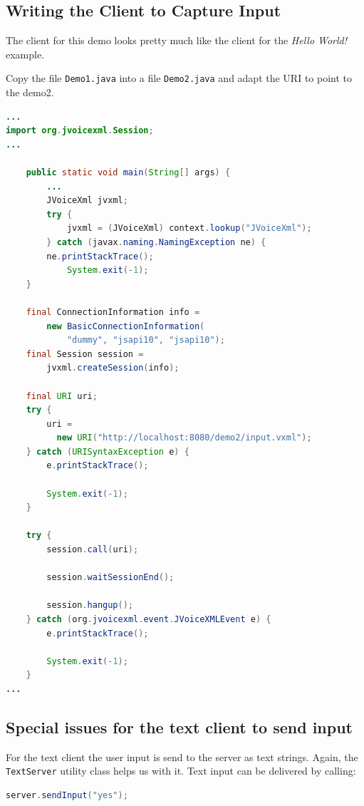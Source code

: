 \documentclass[11pt,a4paper]{book}
\begin{document}
\subsection{Writing the Client to Capture Input}

The client for this demo looks pretty much like the client for the \emph{Hello
World!} example.

Copy the file \texttt{Demo1.java} into a file \texttt{Demo2.java} and adapt the
URI to point to the demo2.

\begin{lstlisting}[language=Java]
...
import org.jvoicexml.Session;
...

    public static void main(String[] args) {
        ...
        JVoiceXml jvxml;
        try {
            jvxml = (JVoiceXml) context.lookup("JVoiceXml");
        } catch (javax.naming.NamingException ne) {
	    ne.printStackTrace();
            System.exit(-1);
    }

    final ConnectionInformation info =
        new BasicConnectionInformation(
            "dummy", "jsapi10", "jsapi10");
    final Session session = 
        jvxml.createSession(info);

    final URI uri;
    try {
        uri = 
          new URI("http://localhost:8080/demo2/input.vxml");
    } catch (URISyntaxException e) {
        e.printStackTrace();

        System.exit(-1);
    }

    try {
        session.call(uri);

        session.waitSessionEnd();

        session.hangup();
    } catch (org.jvoicexml.event.JVoiceXMLEvent e) {
        e.printStackTrace();

        System.exit(-1);
    }
...
\end{lstlisting}

\subsection{Special issues for the text client to send input}

For the text client the user input is send to the server as text strings. Again,
the \lstinline[language=Java]{TextServer} utility class helps us with it.
Text input can be delivered by calling:

\begin{lstlisting}[language=Java]
    server.sendInput("yes");
\end{lstlisting}
\end{document}
